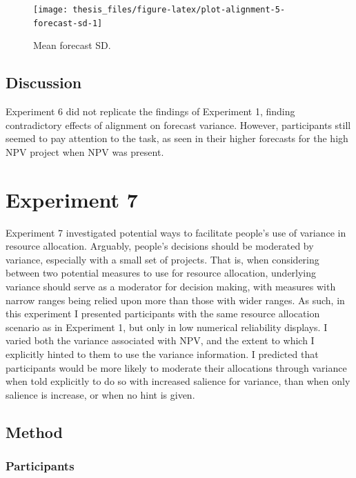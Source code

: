 \documentclass[a4paper, nobind, dvipsnames]{templates/ociamthesis}
\theoremstyle{definition}
\theoremstyle{definition}
\theoremstyle{definition}
\theoremstyle{definition}
\theoremstyle{remark}
\begin{document}
\begin{figure}
\texttt{[image: thesis\_files/figure-latex/plot-alignment-5-forecast-sd-1]} \caption{Mean forecast SD.}\label{fig:plot-alignment-5-forecast-sd}
\end{figure}

\hypertarget{discussion-11}{%
\subsection{Discussion}\label{discussion-11}}

Experiment 6 did not replicate the findings of Experiment 1, finding
contradictory effects of alignment on forecast variance. However, participants
still seemed to pay attention to the task, as seen in their higher forecasts for
the high NPV project when NPV was present.

\hypertarget{alignment-6}{%
\section{Experiment 7}\label{alignment-6}}

Experiment 7 investigated potential ways to facilitate people's use of variance
in resource allocation. Arguably, people's decisions should be moderated by
variance, especially with a small set of projects. That is, when considering
between two potential measures to use for resource allocation, underlying
variance should serve as a moderator for decision making, with measures with
narrow ranges being relied upon more than those with wider ranges. As such, in
this experiment I presented participants with the same resource allocation
scenario as in Experiment 1, but only in low numerical reliability displays. I
varied both the variance associated with NPV, and the extent to which I
explicitly hinted to them to use the variance information. I predicted that
participants would be more likely to moderate their allocations through variance
when told explicitly to do so with increased salience for variance, than when
only salience is increase, or when no hint is given.

\hypertarget{method-15}{%
\subsection{Method}\label{method-15}}

\hypertarget{participants-13}{%
\subsubsection{Participants}\label{participants-13}}
\end{document}
